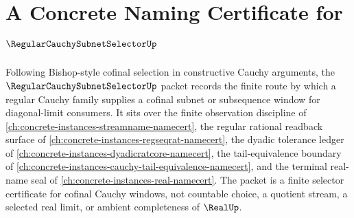 \chapter{A Concrete Naming Certificate for $\RegularCauchySubnetSelectorUp$}
\label{ch:concrete-instances-regular-cauchy-subnet-selector-namecert}

Following Bishop-style cofinal selection in constructive Cauchy arguments, the $\RegularCauchySubnetSelectorUp$ packet records the finite route by which a regular Cauchy family supplies a cofinal subnet or subsequence window for diagonal-limit consumers. It sits over the finite observation discipline of \autoref{ch:concrete-instances-streamname-namecert}, the regular rational readback surface of \autoref{ch:concrete-instances-regseqrat-namecert}, the dyadic tolerance ledger of \autoref{ch:concrete-instances-dyadicratcore-namecert}, the tail-equivalence boundary of \autoref{ch:concrete-instances-cauchy-tail-equivalence-namecert}, and the terminal real-name seal of \autoref{ch:concrete-instances-real-namecert}. The packet is a finite selector certificate for cofinal Cauchy windows, not countable choice, a quotient stream, a selected real limit, or ambient completeness of $\RealUp$.

